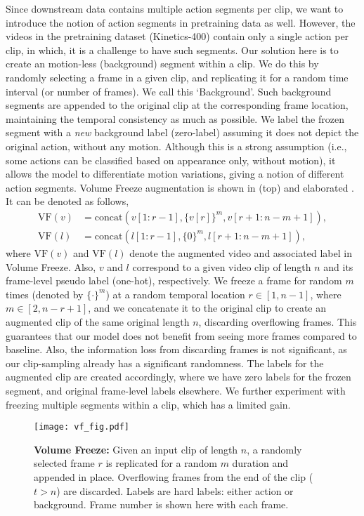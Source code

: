 \documentclass[letterpaper]{article} \usepackage{aaai23}  \usepackage{times}  \usepackage{helvet}  \usepackage{courier}  \usepackage[hyphens]{url}  \usepackage{graphicx} \urlstyle{rm} \def\UrlFont{\rm}  \usepackage{natbib}  \usepackage{caption} \frenchspacing  \setlength{\pdfpagewidth}{8.5in}  \setlength{\pdfpageheight}{11in}  \usepackage{algorithm}
\newcommand{\ch}{}
\begin{document}
Since downstream data contains multiple action segments per clip, we want to introduce the notion of action segments in pretraining data as well. However, the videos in the pretraining dataset (Kinetics-400) contain only a single action per clip, in which, it is a challenge to have such segments. 
Our solution here is to create an motion-less (background) segment within a clip. We do this by randomly selecting a frame in a given clip, and replicating it for a random time interval (or number of frames). We call this `Background'. Such background segments are appended to the original clip at the corresponding frame location, maintaining the temporal consistency as much as possible. We label the frozen segment with a \textit{new} background label (zero-label) assuming it does not depict the original action, without any motion. Although this is a strong assumption (i.e., some actions can be classified based on appearance only, without motion), it allows the model to differentiate motion variations, giving a notion of different action segments. Volume Freeze augmentation is shown in  (top) and elaborated . It can be denoted as follows,
{\small
\begin{align*}
    \text{VF}(v) &= \text{concat}(v[1:r-1], \{v[r]\}^m, v[r+1:n-m+1]), \\
    \text{VF}(l) &= \text{concat}(l[1:r-1], \{0\}^m, l[r+1:n-m+1]),
\end{align*}
}where $\text{VF}(v)$ and $\text{VF}(l)$ denote the augmented video and associated label in Volume Freeze. Also, $v$ and $l$ correspond to a given video clip of length $n$ and its frame-level pseudo label (one-hot), respectively. We freeze a frame for random $m$ times (denoted by $\{\cdot\}^m$) at a random temporal location $r \in [1,n-1]$, where $m \in [2,n-r+1]$, and we concatenate it to the original clip to create an augmented clip of the same original length $n$, discarding overflowing frames. \ch{This guarantees that our model does not benefit from seeing more frames compared to baseline. Also, the information loss from discarding frames is not significant, as our clip-sampling already has a significant randomness.} The labels for the augmented clip are created accordingly, where we have zero labels for the frozen segment, and original frame-level labels elsewhere. We further experiment with freezing multiple segments within a clip, which has a limited gain.

\begin{figure}[t]
	\centering
	\texttt{[image: vf\_fig.pdf]}
	\caption{\textbf{Volume Freeze:} Given an input clip of length $n$, a randomly selected frame $r$ is replicated for a random $m$ duration and appended in place. Overflowing frames from the end of the clip ($t>n$) are discarded. Labels are hard labels: either action or background. Frame number is shown here with each frame.}
	\label{fig:vf}
\end{figure}
\end{document}
